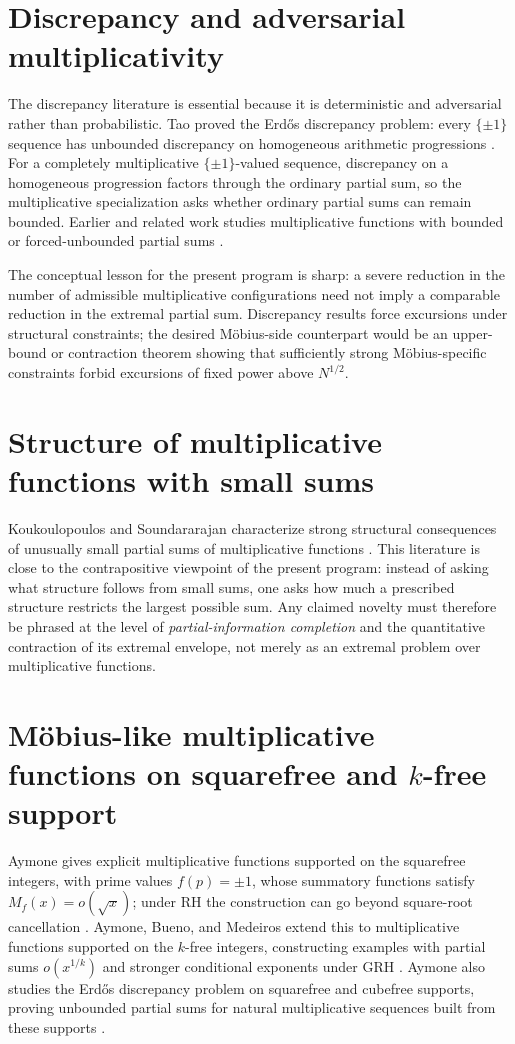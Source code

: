 \documentclass[11pt]{article}
\begin{document}
\section{Discrepancy and adversarial multiplicativity}
The discrepancy literature is essential because it is deterministic and adversarial rather than probabilistic.  Tao proved the Erdős discrepancy problem: every $\{\pm1\}$ sequence has unbounded discrepancy on homogeneous arithmetic progressions \cite{Tao2016}.  For a completely multiplicative $\{\pm1\}$-valued sequence, discrepancy on a homogeneous progression factors through the ordinary partial sum, so the multiplicative specialization asks whether ordinary partial sums can remain bounded.  Earlier and related work studies multiplicative functions with bounded or forced-unbounded partial sums \cite{Coons2010,Vandehey2012}.

The conceptual lesson for the present program is sharp: a severe reduction in the number of admissible multiplicative configurations need not imply a comparable reduction in the extremal partial sum.  Discrepancy results force excursions under structural constraints; the desired Möbius-side counterpart would be an upper-bound or contraction theorem showing that sufficiently strong Möbius-specific constraints forbid excursions of fixed power above $N^{1/2}$.

\section{Structure of multiplicative functions with small sums}
Koukoulopoulos and Soundararajan characterize strong structural consequences of unusually small partial sums of multiplicative functions \cite{KoukSound2020}.  This literature is close to the contrapositive viewpoint of the present program: instead of asking what structure follows from small sums, one asks how much a prescribed structure restricts the largest possible sum.  Any claimed novelty must therefore be phrased at the level of \emph{partial-information completion} and the quantitative contraction of its extremal envelope, not merely as an extremal problem over multiplicative functions.

\section{Möbius-like multiplicative functions on squarefree and $k$-free support}
Aymone gives explicit multiplicative functions supported on the squarefree integers, with prime values $f(p)=\pm1$, whose summatory functions satisfy $M_f(x)=o(\sqrt{x})$; under RH the construction can go beyond square-root cancellation \cite{Aymone2020}.  Aymone, Bueno, and Medeiros extend this to multiplicative functions supported on the $k$-free integers, constructing examples with partial sums $o(x^{1/k})$ and stronger conditional exponents under GRH \cite{AymoneBuenoMedeiros2022}.  Aymone also studies the Erdős discrepancy problem on squarefree and cubefree supports, proving unbounded partial sums for natural multiplicative sequences built from these supports \cite{Aymone2022Discrepancy}.
\end{document}
